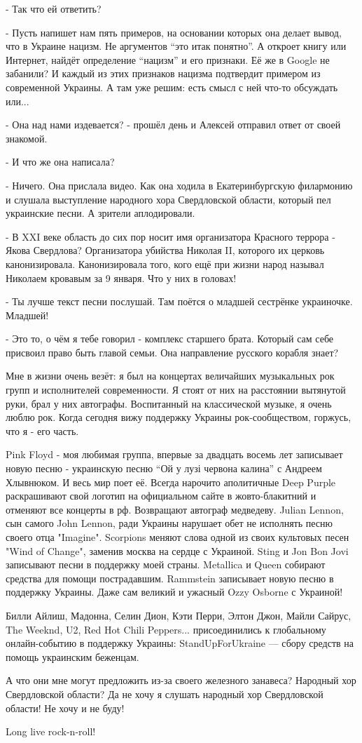 - Так что ей ответить?

- Пусть напишет нам пять примеров, на основании которых она делает вывод, что в
Украине нацизм. Не аргументов \enquote{это итак понятно}. А откроет книгу или Интернет,
найдёт определение \enquote{нацизм} и его признаки. Её же в Google не забанили? И
каждый из этих признаков нацизма подтвердит примером из современной Украины. А
там уже решим: есть смысл с ней что-то обсуждать или... 

- Она над нами издевается? - прошёл день и Алексей отправил ответ от своей
знакомой.

- И что же она написала?

- Ничего. Она прислала видео. Как она ходила в Екатеринбургскую филармонию и
слушала выступление народного хора Свердловской области, который пел украинские
песни. А зрители аплодировали.

- В XXI веке область до сих пор носит имя организатора Красного террора - Якова
Свердлова? Организатора убийства Николая II, которого их церковь
канонизировала. Канонизировала того, кого ещё при жизни народ называл Николаем
кровавым за 9 января. Что у них в головах!

- Ты лучше текст песни послушай. Там поётся о младшей сестрёнке украиночке.
Младшей! 

- Это то, о чём я тебе говорил - комплекс старшего брата. Который сам себе
присвоил право быть главой семьи. Она направление русского корабля знает?

Мне в жизни очень везёт: я был на концертах величайших музыкальных рок групп
и исполнителей современности. Я стоят от них на расстоянии вытянутой руки,
брал у них автографы. Воспитанный на классической музыке, я очень люблю рок.
Когда сегодня вижу поддержку Украины рок-сообществом, горжусь, что я - его
часть. 

Pink Floyd - моя любимая группа, впервые за двадцать восемь лет записывает
новую песню - украинскую песню \enquote{Ой у лузі червона калина} с Андреем
Хлывнюком. И весь мир поет её. Всегда нарочито аполитичные Deep Purple
раскрашивают свой логотип на официальном сайте в жовто-блакитний и отменяют
все концерты в рф. Возвращают автограф медведеву. Julian Lennon, сын самого
John Lennon, ради Украины нарушает обет не исполнять песню своего отца
"Imagine". Scorpions меняют слова одной из своих культовых песен "Wind of
Change", заменив москва на сердце с Украиной. Sting и Jon Bon Jovi записывают
песни в поддержку моей страны. Metallica и Queen собирают средства для помощи
пострадавшим. Rammstein записывает новую песню в поддержку Украины. Даже сам
великий и ужасный Ozzy Osborne с Украиной! 

Билли Айлиш, Мадонна, Селин Дион, Кэти Перри, Элтон Джон, Майли Сайрус, The
Weeknd, U2, Red Hot Chili Peppers... присоединились к глобальному
онлайн-событию в поддержку Украины: StandUpForUkraine — сбору средств на
помощь украинским беженцам.

А что они мне могут предложить из-за своего железного занавеса? Народный хор
Свердловской области? Да не хочу я слушать народный хор Свердловской области!
Не хочу и не буду! 

Long live rock-n-roll!

